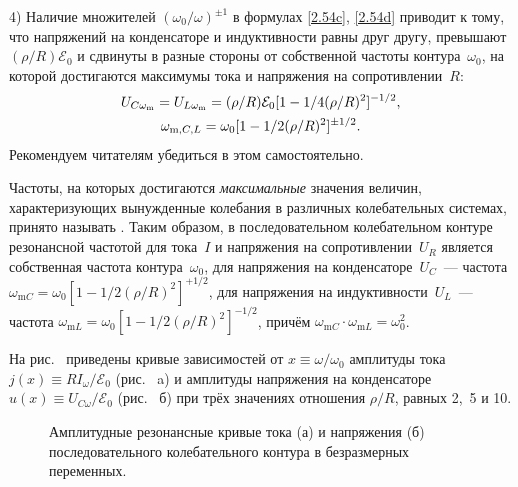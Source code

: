 4) Наличие множителей $(\omega_0 / \omega)^{\pm 1}$ в формулах \eqref{2.54c}, \eqref{2.54d} приводит к тому,
что  напряжений на конденсаторе и индуктивности равны друг
другу, превышают $(\rho/R)\mathcal{E}_0$ и сдвинуты в разные стороны от
собственной частоты контура~$\omega_0$, на которой достигаются максимумы тока и
напряжения на сопротивлении~$R$:
\begin{equation}
	\eqmark{2.57}
	\begin{gathered}[c]
U_{C\omega_\text{m}}=U_{L\omega_\text{m}}=(\rho/R)\mathcal{E}_0[1-1/4(\rho/R)^2]
^{-1/2},\\
		\omega_{\text{m},C,L}=\omega_0[1-1/2(\rho/R)^2]^{\pm1/2}.
	\end{gathered}
\end{equation}
Рекомендуем читателям убедиться в этом самостоятельно.

Частоты, на которых достигаются \emph{максимальные} значения величин,
характеризующих вынужденные колебания в различных колебательных системах,
принято называть . Таким образом, в последовательном
колебательном контуре резонансной частотой для тока~$I$ и напряжения на
сопротивлении~$U_R$ является собственная частота контура~$\omega_0$, для
напряжения на конденсаторе~$U_C$~--- частота
$\omega_{\text{m}C}=\omega_0[1-1/2(\rho/R)^2]^{+1/2}$, для напряжения на
индуктивности~$U_L$~--- частота
$\omega_{\text{m}L}=\omega_0[1-1/2(\rho/R)^2]^{-1/2}$, причём
$\omega_{\text{m}C}\cdot\omega_{\text{m}L}=\omega_0^2$.

На рис.~ приведены  кривые
зависимостей от $x\equiv\omega/\omega_0$ амплитуды тока $j(x)\equiv
RI_\omega/\mathcal{E}_0$ (рис.~ a) и амплитуды напряжения на
конденсаторе $u(x)\equiv U_{C\omega}/\mathcal{E}_0$  (рис.~ б) при
трёх значениях отношения $\rho/R$, равных 2,~5 и 10.
\begin{figure}[h]
		\begin{minipage}[h]{0.5\linewidth}
			\centering
		\end{minipage}
		\hfill
		\begin{minipage}[h]{0.5\linewidth}
			\centering
		\end{minipage}
		\caption{Амплитудные резонансные кривые тока (а) и напряжения (б) последовательного колебательного контура в безразмерных переменных.}
\end{figure}

